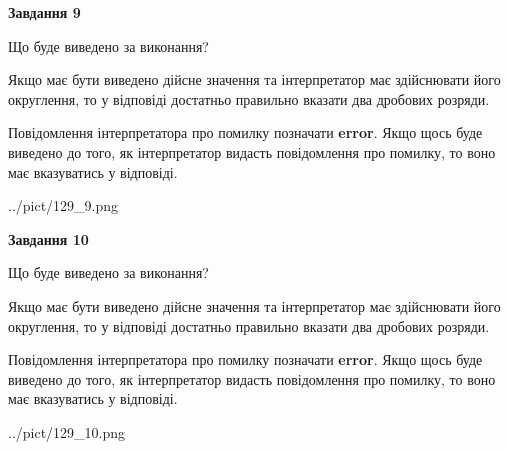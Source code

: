 \documentclass[12pt, ukrainian]{article}
\begin{document}
{\begin {Large}
{\begin {center}\textbf{Завдання 9}\end {center}}\par
Що буде виведено за виконання? \par

Якщо має бути виведено дійсне значення та інтерпретатор має здійснювати його округлення, 
то у відповіді достатньо правильно вказати два дробових розряди.

Повідомлення інтерпретатора про помилку позначати \textbf{error}.
Якщо щось буде виведено до того, як інтерпретатор видасть повідомлення про помилку, 
то воно має вказуватись у відповіді. \par

\begin{center}
	{../pict/129_9.png}
\end{center}
\newpage

{\begin {center}\textbf{Завдання 10}\end {center}}\par
Що буде виведено за виконання? \par

Якщо має бути виведено дійсне значення та інтерпретатор має здійснювати його округлення, 
то у відповіді достатньо правильно вказати два дробових розряди.

Повідомлення інтерпретатора про помилку позначати \textbf{error}.
Якщо щось буде виведено до того, як інтерпретатор видасть повідомлення про помилку, 
то воно має вказуватись у відповіді. \par

\begin{center}
	{../pict/129_10.png}
\end{center}
\newpage

\end {Large}}
\end{document}
